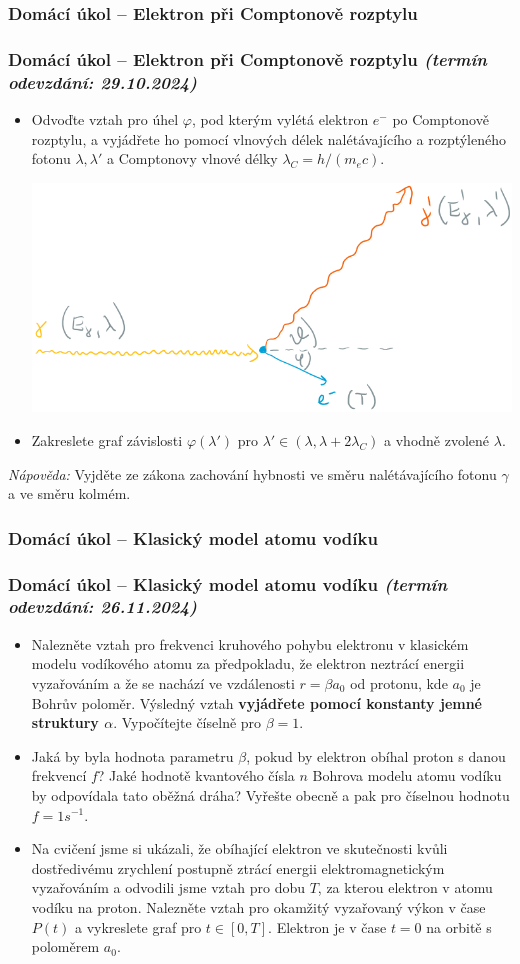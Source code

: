 \documentclass[a4paper,11pt,twoside]{article}
\newenvironment{homework}{}{}
\newcommand{\np}{\clearpage\newpage}
\newcommand{\exercise}[2][]{\ifthenelse{\isempty{#1}}
	{\np\thispagestyle{empty}\subsubsection*{Domácí úkol -- #2}}
	{\np\thispagestyle{empty}\np\subsubsection*{Domácí úkol -- #2 \small{\it{(termín odevzdání: {#1})}}}}
}
\begin{document}
\begin{homework}
\exercise[29.10.2024]{Elektron při Comptonově rozptylu}
	\begin{itemize}
	\item
		Odvoďte vztah pro úhel $\varphi$, pod kterým vylétá elektron $e^{-}$ po Comptonově rozptylu, a vyjádřete ho pomocí vlnových délek nalétávajícího a rozptýleného fotonu $\lambda,\lambda'$ a Comptonovy vlnové délky $\lambda_{C}=h/(m_{e}c)$.
		\begin{center}
			\includegraphics[width=0.8\linewidth]{Compton.png}
		\end{center}
	
	\item 
		Zakreslete graf závislosti $\varphi(\lambda')$ pro $\lambda'\in(\lambda,\lambda+2\lambda_{C})$ a vhodně zvolené $\lambda$.

	\end{itemize}
	\emph{Nápověda:} Vyjděte ze zákona zachování hybnosti ve směru nalétávajícího fotonu $\gamma$ a ve směru kolmém.
\end{homework}

\begin{homework}
	\exercise[26.11.2024]{Klasický model atomu vodíku}
	\begin{itemize}
		\item     
			Nalezněte vztah pro frekvenci kruhového pohybu elektronu v klasickém modelu vodíkového atomu za předpokladu, že elektron neztrácí energii vyzařováním a že se nachází ve vzdálenosti $r=\beta a_{0}$ od protonu, kde $a_{0}$ je Bohrův poloměr.
			Výsledný vztah {\bf vyjádřete pomocí konstanty jemné struktury $\alpha$}.
			Vypočítejte číselně pro $\beta=1$.

		\item
			Jaká by byla hodnota parametru $\beta$, pokud by elektron obíhal proton s danou frekvencí $f$?
			Jaké hodnotě kvantového čísla $n$ Bohrova modelu atomu vodíku by odpovídala tato oběžná dráha?
			Vyřešte obecně a pak pro číselnou hodnotu $f=1\unit{s^{-1}}$.

		\item
			Na cvičení jsme si ukázali, že obíhající elektron ve skutečnosti kvůli dostředivému zrychlení postupně ztrácí energii elektromagnetickým vyzařováním a odvodili jsme vztah pro dobu $T$, za kterou elektron v atomu vodíku  na proton.
			Nalezněte vztah pro okamžitý vyzařovaný výkon v čase $P(t)$ a vykreslete graf pro $t\in[0,T]$.
			Elektron je v čase $t=0$ na orbitě s poloměrem $a_{0}$.
	\end{itemize}
\end{homework}
\end{document}

